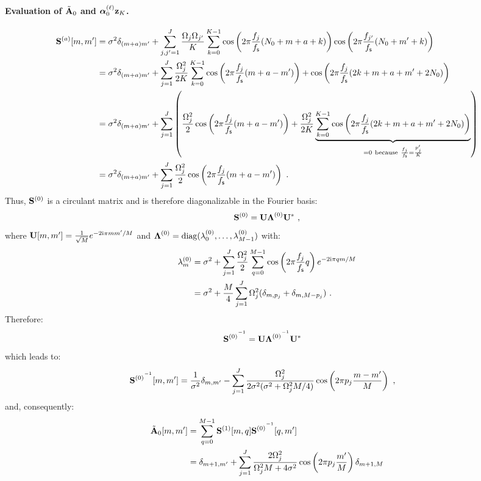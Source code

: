\paragraph{Evaluation of $\tilde{{\mathbf A}}_0$ and $\boldsymbol{\alpha}_0^{(\ell)}{\mathbf z}_K$.}
\begin{align*}
\bS^{(a)}[m,m'] &= \sigma^2\delta_{(m+a)m'}+\sum_{j,j'=1}^J\dfrac{\Omega_j\Omega_{j'}}{K}\sum_{k=0}^{K-1} \cos\left(2\pi \frac{f_j}{\fs}(N_0+m+a+k)\right)\cos\left(2\pi \frac{f_{j'}}{\fs}(N_0+m'+k)\right) \\
&= \sigma^2\delta_{(m+a)m'}+\sum_{j=1}^J\dfrac{\Omega_j^2}{2K}\sum_{k=0}^{K-1} \cos\left(2\pi \frac{f_j}{\fs}(m+a-m')\right) + \cos\left(2\pi \frac{f_j}{\fs}(2k+m+a+m'+2N_0)\right)\\
&= \sigma^2\delta_{(m+a)m'}+\sum_{j=1}^J\left( \dfrac{\Omega_j^2}2\cos\left(2\pi \frac{f_j}{\fs}(m+a-m')\right) + \dfrac{\Omega_j^2}{2K}\underbrace{\sum_{k=0}^{K-1}\cos\left(2\pi \frac{f_j}{\fs}(2k+m+a+m'+2N_0)\right)}_{=0\ \mathrm{because}\ \frac{f_j}\fs=\frac{p'_j}K } \right)\\
&= \sigma^2\delta_{(m+a)m'}+\sum_{j=1}^J\dfrac{\Omega_j^2}2\cos\left(2\pi \frac{f_j}{\fs}(m+a-m')\right)\ .
\end{align*}
Thus, ${\mathbf S}^{(0)}$ is a circulant matrix and is therefore diagonalizable in the Fourier basis:
\[
{\mathbf S}^{(0)} = {\mathbf U}\boldsymbol{\Lambda}^{(0)}{\mathbf U}^*\ ,
\]
where ${\mathbf U}[m,m']=\frac1{\sqrt{M}}e^{-2\mathrm{i}\pi mm'/M}$ and $\boldsymbol{\Lambda}^{(0)} = \mathrm{diag}(\lambda_0^{(0)},\dots,\lambda_{M-1}^{(0)})$ with:
\begin{align*}
\lambda_m^{(0)} &= \sigma^2 + \sum_{j=1}^J\dfrac{\Omega_j^2}2\sum_{q=0}^{M-1} \cos\left(2\pi\frac{f_j}{f_{\mathsf s}} q\right) e^{-2\mathrm{i}\pi qm/M} \\
&= \sigma^2 + \dfrac{M}{4}\sum_{j=1}^J\Omega_j^2(\delta_{m,p_j} + \delta_{m,M-p_j})\ .
\end{align*}
Therefore:
\begin{align*}
{{\mathbf S}^{(0)}}^{^{-1}}  &= {\mathbf U}{\boldsymbol{\Lambda}^{(0)}}^{^{-1}}{\mathbf U}^*
\end{align*}
which leads to:
\begin{align*}
{{\mathbf S}^{(0)}}^{^{-1}}[m,m']  &= \dfrac1{\sigma^2}\delta_{m,m'}-\sum_{j=1}^J\dfrac{\Omega_j^2}{2\sigma^2(\sigma^2+\Omega_j^2M/4)}\cos\left(2\pi p_j \dfrac{m-m'}{M}\right)\ ,
\end{align*}
and, consequently:
\begin{align}
\nonumber
\tilde{{\mathbf A}}_0[m,m']  &= \sum_{q=0}^{M-1} {{\mathbf S}^{(1)}}[m,q]{{\mathbf S}^{(0)}}^{^{-1}}[q,m'] \\
&= \delta_{m+1,m'} + \sum_{j=1}^J\dfrac{2\Omega_j^2}{\Omega_j^2M+4\sigma^2}\cos\left(2\pi p_j\frac{m'}{M}\right)\delta_{m+1,M}
\label{eq:A0.sine}
\end{align}
